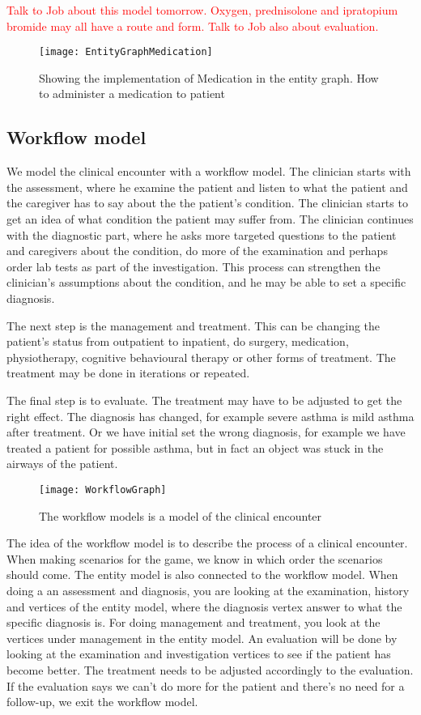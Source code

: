  
 \textcolor{red}{Talk to Job about this model tomorrow. Oxygen, prednisolone and ipratopium bromide may all have a route and form. Talk to Job also about evaluation.}
\begin{figure}[h!]
	\caption {Showing the implementation of Medication in the entity graph. How to administer a medication to patient}
	\label{fig:EntityGraphMedication}
	\texttt{[image: EntityGraphMedication]}
\end{figure}





\subsection{Workflow model}
We model the clinical encounter with a workflow model. The clinician starts with the assessment, where he examine the patient and listen to what the patient and the caregiver has to say about the the patient's condition. The clinician starts to get an idea of what condition the patient may suffer from. The clinician continues with the diagnostic part, where he asks more targeted questions to the patient and caregivers about the condition, do more of the examination and perhaps order lab tests as part of the investigation. This process can strengthen the clinician's assumptions about the condition, and he may be able to set a specific diagnosis.

The next step is the management and treatment. This can be changing the patient's status from outpatient to inpatient, do surgery, medication, physiotherapy, cognitive behavioural therapy or other forms of treatment. The treatment may be done in iterations or repeated.


The final step is to evaluate. The treatment may have to be adjusted to get the right effect. The diagnosis has changed, for example severe asthma is mild asthma after treatment. Or we have initial set the wrong diagnosis, for example we have treated a patient for possible asthma, but in fact an object was stuck in the airways of the patient.


\begin{figure}[h!]
	\caption {The workflow models is a model of the clinical encounter}
	\label{fig:WorkflowGraph}
	\texttt{[image: WorkflowGraph]}
\end{figure}

The idea of the workflow model is to describe the process of a clinical encounter. When making scenarios for the game, we know in which order the scenarios should come. The entity model is also connected to the workflow model. When doing a an assessment and diagnosis, you are looking at the examination, history and vertices of the entity model, where the diagnosis vertex answer to what the specific diagnosis is. For doing management and treatment, you look at the vertices under management in the entity model. An evaluation will be done by looking at the examination and investigation vertices to see if the patient has become better. The treatment needs to be adjusted accordingly to the evaluation. If the evaluation says we can't do more for the patient and there's no need for a follow-up, we exit the workflow model.

